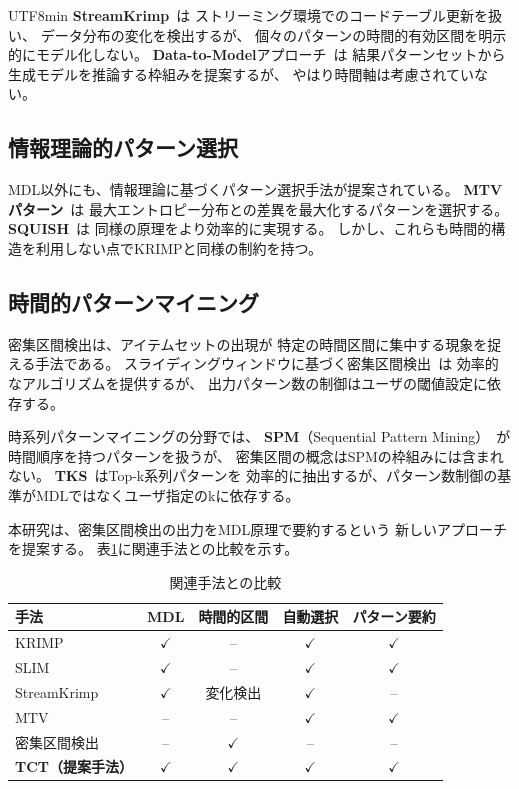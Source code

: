 \documentclass[11pt,a4paper]{article}
\begin{document}
\begin{CJK}{UTF8}{min}
\textbf{StreamKrimp}~\cite{van2014streamkrimp}は
ストリーミング環境でのコードテーブル更新を扱い、
データ分布の変化を検出するが、
個々のパターンの時間的有効区間を明示的にモデル化しない。
\textbf{Data-to-Model}アプローチ~\cite{dalleiger2022data}は
結果パターンセットから生成モデルを推論する枠組みを提案するが、
やはり時間軸は考慮されていない。

\subsection{情報理論的パターン選択}

MDL以外にも、情報理論に基づくパターン選択手法が提案されている。
\textbf{MTVパターン}~\cite{de2012mtv}は
最大エントロピー分布との差異を最大化するパターンを選択する。
\textbf{SQUISH}~\cite{mampaey2012squish}は
同様の原理をより効率的に実現する。
しかし、これらも時間的構造を利用しない点でKRIMPと同様の制約を持つ。

\subsection{時間的パターンマイニング}

密集区間検出は、アイテムセットの出現が
特定の時間区間に集中する現象を捉える手法である。
スライディングウィンドウに基づく密集区間検出~\cite{apriori_window}は
効率的なアルゴリズムを提供するが、
出力パターン数の制御はユーザの閾値設定に依存する。

時系列パターンマイニングの分野では、
\textbf{SPM}（Sequential Pattern Mining）~\cite{fournier2017survey}が
時間順序を持つパターンを扱うが、
密集区間の概念はSPMの枠組みには含まれない。
\textbf{TKS}~\cite{fournier2013tks}はTop-k系列パターンを
効率的に抽出するが、パターン数制御の基準がMDLではなくユーザ指定のkに依存する。

本研究は、密集区間検出の出力をMDL原理で要約するという
新しいアプローチを提案する。
表\ref{tab:related_comparison}に関連手法との比較を示す。

\begin{table}[t]
\centering
\caption{関連手法との比較}\label{tab:related_comparison}
\begin{tabular}{lcccc}
\toprule
手法 & MDL & 時間的区間 & 自動選択 & パターン要約 \\
\midrule
KRIMP~\cite{vreeken2011krimp}            & $\checkmark$ & --           & $\checkmark$ & $\checkmark$ \\
SLIM~\cite{smets2012slim}              & $\checkmark$ & --           & $\checkmark$ & $\checkmark$ \\
StreamKrimp~\cite{van2014streamkrimp}       & $\checkmark$ & 変化検出     & $\checkmark$ & -- \\
MTV~\cite{de2012mtv}               & --           & --           & $\checkmark$ & $\checkmark$ \\
密集区間検出~\cite{apriori_window}  & --           & $\checkmark$ & --           & -- \\
\textbf{TCT（提案手法）}           & $\checkmark$ & $\checkmark$ & $\checkmark$ & $\checkmark$ \\
\bottomrule
\end{tabular}
\end{table}



\end{CJK}
\end{document}
